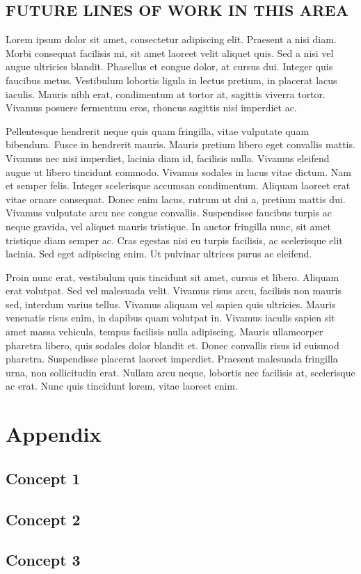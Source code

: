 \documentclass[titlepage,a4paper,12pt,thmsb]{report}
\begin{document}
\section{\bf FUTURE LINES OF WORK IN THIS AREA}
Lorem ipsum dolor sit amet, consectetur adipiscing elit. Praesent a nisi diam. Morbi consequat facilisis mi, sit amet laoreet velit aliquet quis. Sed a nisi vel augue ultricies blandit. Phasellus et congue dolor, at cursus dui. Integer quis faucibus metus. Vestibulum lobortis ligula in lectus pretium, in placerat lacus iaculis. Mauris nibh erat, condimentum at tortor at, sagittis viverra tortor. Vivamus posuere fermentum eros, rhoncus sagittis nisi imperdiet ac.

Pellentesque hendrerit neque quis quam fringilla, vitae vulputate quam bibendum. Fusce in hendrerit mauris. Mauris pretium libero eget convallis mattis. Vivamus nec nisi imperdiet, lacinia diam id, facilisis nulla. Vivamus eleifend augue ut libero tincidunt commodo. Vivamus sodales in lacus vitae dictum. Nam et semper felis. Integer scelerisque accumsan condimentum. Aliquam laoreet erat vitae ornare consequat. Donec enim lacus, rutrum ut dui a, pretium mattis dui. Vivamus vulputate arcu nec congue convallis. Suspendisse faucibus turpis ac neque gravida, vel aliquet mauris tristique. In auctor fringilla nunc, sit amet tristique diam semper ac. Cras egestas nisi eu turpis facilisis, ac scelerisque elit lacinia. Sed eget adipiscing enim. Ut pulvinar ultrices purus ac eleifend.

Proin nunc erat, vestibulum quis tincidunt sit amet, cursus et libero. Aliquam erat volutpat. Sed vel malesuada velit. Vivamus risus arcu, facilisis non mauris sed, interdum varius tellus. Vivamus aliquam vel sapien quis ultricies. Mauris venenatis risus enim, in dapibus quam volutpat in. Vivamus iaculis sapien sit amet massa vehicula, tempus facilisis nulla adipiscing. Mauris ullamcorper pharetra libero, quis sodales dolor blandit et. Donec convallis risus id euismod pharetra. Suspendisse placerat laoreet imperdiet. Praesent malesuada fringilla urna, non sollicitudin erat. Nullam arcu neque, lobortis nec facilisis at, scelerisque ac erat. Nunc quis tincidunt lorem, vitae laoreet enim.


\chapter{Appendix}
\section{Concept 1}

\section{Concept 2}

\section{Concept 3}


\end{document}
